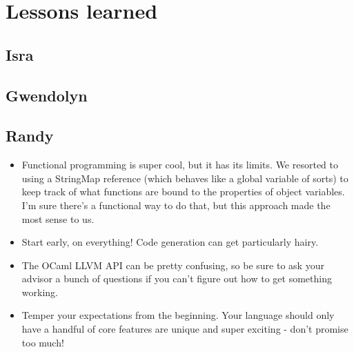 \section{Lessons learned} 

\subsection{Isra}

\subsection{Gwendolyn}

\subsection{Randy}
\begin{itemize}
    \item Functional programming is super cool, but it has its limits. We resorted to using a
          StringMap reference (which behaves like a global variable of sorts) to keep track of what
          functions are bound to the properties of object variables. I'm sure there's a
          functional way to do that, but this approach made the most sense to us.
    \item Start early, on everything! Code generation can get particularly hairy.
    \item The OCaml LLVM API can be pretty confusing, so be sure to ask your advisor a bunch
          of questions if you can't figure out how to get something working.
    \item Temper your expectations from the beginning. Your language should only have a handful of
          core features are unique and super exciting - don't promise too much!
\end{itemize}

